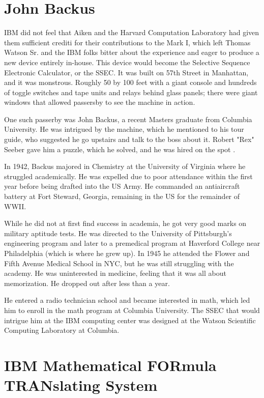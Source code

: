 \section{John Backus}

IBM did not feel that Aiken and the Harvard Computation Laboratory had
given them sufficient crediti for their contributions to the Mark I,
which left Thomas Watson Sr. and the IBM folks bitter about the experience
and eager to produce a new device entirely in-house.
This device would become the Selective Sequence Electronic Calculator, or the SSEC.
It was built on 57th Street in Manhattan, and it was monstrous.
Roughly 50 by 100 feet with a giant console and hundreds of toggle switches and
tape units and relays behind glass panels; there were giant windows that allowed
passersby to see the machine in action.

One such passerby was John Backus, a recent Masters graduate from Columbia University.
He was intrigued by the machine, which he mentioned to his tour guide,
who suggested he go upstairs and talk to the boss about it.
Robert "Rex" Seeber gave him a puzzle, which he solved, and he was hired on the spot
\cite{backus_oral_history_2006}.

In 1942, Backus majored in Chemistry at the University of Virginia where he 
struggled academically. He was expelled due to poor attendance within the first 
year before being drafted into the US Army.
He commanded an antiaircraft battery at Fort Steward, Georgia, remaining in the 
US for the remainder of WWII.

While he did not at first find success in academia, he got very good marks on 
military aptitude tests. He was directed to the University of Pittsburgh's 
engineering program and later to a premedical program at Haverford College near 
Philadelphia (which is where he grew up). In 1945 he attended the Flower and 
Fifth Avenue Medical School in NYC, but he was still struggling with the 
academy.
He was uninterested in medicine, feeling that it was all about memorization. He 
dropped out after less than a year.

He entered a radio technician school and became interested in math, which led 
him to enroll in the math program at Columbia University. The SSEC that would 
intrigue him at the IBM computing center was designed at the Watson Scientific 
Computing Laboratory at Columbia.

\section{IBM Mathematical FORmula TRANslating System}

